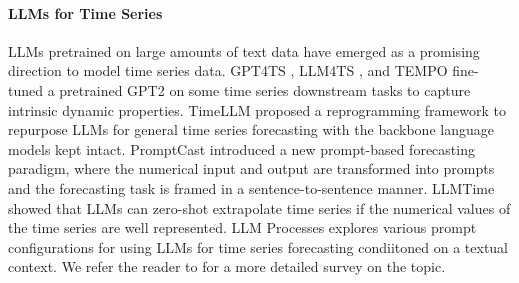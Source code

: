 \paragraph{{LLMs for Time Series}} LLMs pretrained on large amounts of text data have emerged as a promising direction to model time series data.
GPT4TS \citep{Zhou2023One}, LLM4TS \citep{Chang2024Llm4ts}, and TEMPO \citep{Cao2024Tempo} fine-tuned a pretrained GPT2 \citep{Radford2019Language} on some time series downstream tasks to capture intrinsic dynamic properties.
TimeLLM \citep{Jin2023TimeLLM} proposed a reprogramming framework to repurpose LLMs for general time series forecasting with the backbone language models kept intact.
PromptCast \citep{Xue2023Promptcast} introduced  a new prompt-based forecasting paradigm, where the numerical input and output are transformed into prompts and the forecasting task is framed in a sentence-to-sentence manner.
LLMTime \citep{Gruver2023Large} showed that LLMs can zero-shot extrapolate time series if the numerical values of the time series are well represented. LLM Processes \citep{requeima2024llm} explores various prompt configurations for using LLMs for time series forecasting condiitoned on a textual context. We refer the reader to \citep{zhang2024large} for a more detailed survey on the topic.


